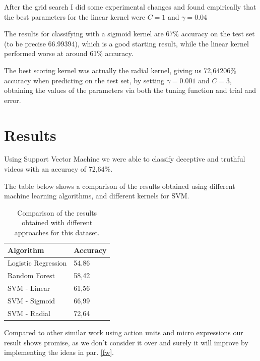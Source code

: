 After the grid search I did some experimental changes and found empirically that the best parameters for the linear kernel were $C = 1$ and $\gamma = 0.04$

The results for classifying with a sigmoid kernel are 67\% accuracy on the test set (to be precise 66.99394), which is a good starting result, while the linear kernel performed worse at around 61\% accuracy.

The best scoring kernel was actually the radial kernel, giving us 72,64206\% accuracy when predicting on the test set, by setting $\gamma  = 0.001$ and $C = 3$, obtaining the values of the parameters via both the tuning function and trial and error.

\clearpage

\section{Results} \label{results}
Using Support Vector Machine we were able to classify deceptive and truthful videos with an accuracy of 72,64\%.

The table below shows a comparison of the results obtained using different machine learning algorithms, and different kernels for SVM.

\begin{table}[H]
	\centering
	\begin{tabular}{|l|l|}
		\hline
		\textbf{Algorithm}  & \textbf{Accuracy} \\ \hline
		Logistic Regression & 54.86             \\ \hline
		Random Forest       & 58,42             \\ \hline
		SVM - Linear        & 61,56             \\ \hline
		SVM - Sigmoid        & 66,99             \\ \hline
		SVM - Radial       & 72,64             \\ \hline
	\end{tabular}
	\caption{Comparison of the results obtained with different approaches for this dataset.}
\end{table}


Compared to other similar work using action units and micro expressions our result shows promise, as we don't consider it over and surely it will improve by implementing the ideas in par. \ref{fw}. 

